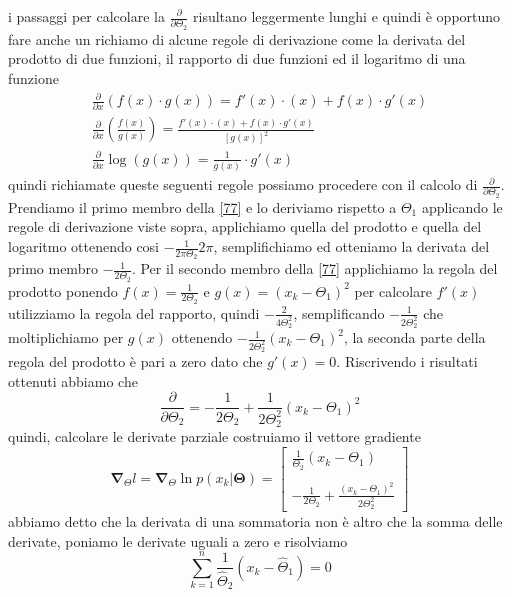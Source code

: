 i passaggi per calcolare la $\frac{\partial }{ \partial \Theta_2}$ risultano leggermente lunghi e quindi è opportuno fare anche un richiamo di alcune regole di derivazione come la derivata del prodotto di due funzioni, il rapporto di due funzioni ed il logaritmo di una funzione
\begin{gather}
\frac{\partial}{\partial x}(f(x)\cdot g(x)) = f'(x)\cdot (x) + f(x) \cdot g'(x)\\
\frac{\partial}{\partial x} \left( \frac{f(x)}{g(x)} \right) = \frac{f'(x)\cdot (x) + f(x) \cdot g'(x)}{[g(x)]^2}\\
\frac{\partial}{\partial x} \log(g(x)) = \frac{1}{g(x)} \cdot g'(x)
\end{gather}
quindi richiamate queste seguenti regole possiamo procedere con il calcolo di $\frac{\partial }{ \partial \Theta_2}$. Prendiamo il primo membro della \ref{77} e lo deriviamo rispetto a $\Theta_1$
applicando le regole di derivazione viste sopra, applichiamo quella del prodotto e quella del logaritmo ottenendo cosi $- \frac{1}{2 \pi \Theta_2} 2\pi$, semplifichiamo ed otteniamo la derivata del primo membro $-\frac{1}{2 \Theta_2}$. Per il secondo membro della \ref{77} applichiamo la regola del prodotto ponendo $f(x) = \frac{1}{2\Theta_2}$ e $g(x) = (x_k-\Theta_1)^2$ per calcolare $f'(x)$ utilizziamo la regola del rapporto, quindi $-\frac{2}{4 \Theta_2^2}$, semplificando $-\frac{1}{2 \Theta_2^2}$ che moltiplichiamo per $g(x)$ ottenendo $-\frac{1}{2 \Theta_2^2} (x_k-\Theta_1)^2$, la seconda parte della regola del prodotto è pari a zero dato che $g'(x) = 0$.  Riscrivendo i risultati ottenuti abbiamo che
\begin{equation}
\frac{\partial }{ \partial \Theta_2} =  -\frac{1}{2 \Theta_2} + \frac{1}{2 \Theta_2^2} (x_k-\Theta_1)^2
\end{equation}
quindi, calcolare le derivate parziale costruiamo il vettore gradiente
\begin{equation}
\mathbf{\nabla}_\Theta l = \mathbf{\nabla}_\Theta \ln p(x_k|\mathbf{\Theta}) =
    \begin{bmatrix}
    \frac{1}{\Theta_2}(x_k - \Theta_1) \\
    \\
    -\frac{1}{2 \Theta_2} + \frac{(x_k - \Theta_1)^2}{2 \Theta_2^2}
    \end{bmatrix}
\end{equation}
abbiamo detto che la derivata di una sommatoria non è altro che la somma delle derivate, poniamo le derivate uguali a zero e risolviamo
\begin{equation}
\sum_{k=1}^n \frac{1}{\hat{\Theta}_2}(x_k -\hat{\Theta}_1) = 0
\end{equation}
